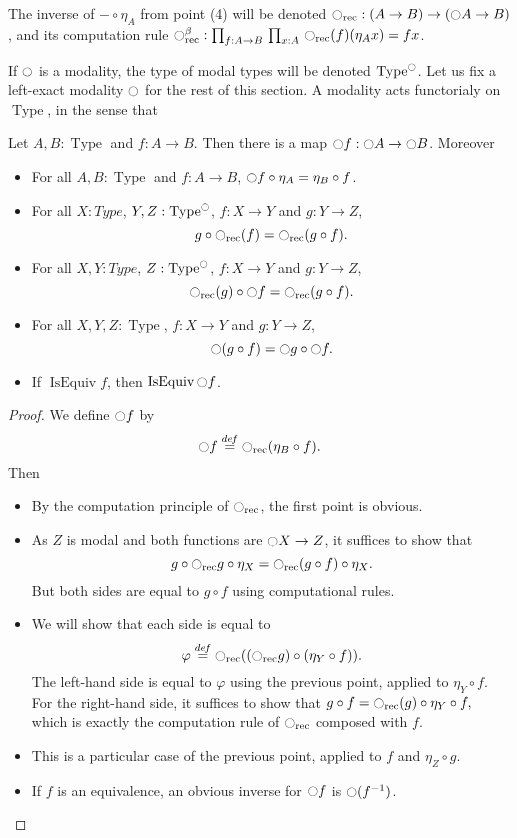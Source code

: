 \documentclass[notfinal]{jfrarticle}
\DeclareMathOperator{\Type}{Type}
\DeclareMathOperator{\IsEquiv}{IsEquiv}
\newcommand \defeq {\overset{de\hspace{-0.2ex}f}{=}}
\newcommand{\modal}{\ensuremath{\ocircle}}
\newcommand{\prodD}[3]{\prod_{#1:#2}\, #3}
\begin{document}
\begin{rmq}
  The inverse of $- \circ \eta_A$ from point {(4)} will be
  denoted $\modal_{\mathrm{rec}}: (A\to B) \to (\modal A \to B)$, and its
  computation rule $\modal_{\mathrm{rec}}^\beta : \prodD f {A \to B} {\prodD x A
  {\modal_{\mathrm{rec}}(f) (\eta_A x) = f x}}$.
\end{rmq}

If $\modal$ is a modality, the type of modal types will be denoted
$\Type^\modal$. Let us fix a left-exact modality $\modal$ for the rest
of this section. A modality acts functorialy on $\Type$, in the sense
that

\begin{lem}
  Let $A,B:\Type$ and $f:A\to B$. Then there is a map $\modal f:\modal
  A \to \modal B$. Moreover
  \begin{itemize}
  \item For all $A,B:\Type$ and $f:A\to B$, $\modal f \circ \eta_A = \eta_B \circ f$.
  \item For all $X:Type$, $Y,Z:\Type^\modal$, $f:X\to Y$ and $g:Y\to
    Z$, 
    \[g \circ \modal_{\text{rec}}(f) = \modal_{\text{rec}} (g\circ
    f).\]
  \item For all $X,Y:Type$, $Z:\Type^\modal$, $f:X\to Y$ and $g:Y\to
    Z$, \[\modal_{\text{rec}}(g) \circ \modal f = \modal_{\text{rec}}
    (g\circ f).\]
  \item For all $X,Y,Z:\Type$, $f:X\to Y$ and $g:Y\to Z$, 
    \[\modal (g \circ f) = \modal g \circ \modal f.\]
  \item If $\IsEquiv f$, then $\IsEquiv \modal f$.
  \end{itemize}
\end{lem}
\begin{proof}
  We define $\modal f$ by
  \[ \modal f \defeq \modal_{\text{rec}}(\eta_B \circ f).\]
  Then
  \begin{itemize}
  \item By the computation principle of $\modal_{\text{rec}}$, the
    first point is obvious.
  \item As $Z$ is modal and both functions are $\modal X\to Z$, it suffices to show that 
    \[g \circ \modal_{\text{rec}} g \circ \eta_X = \modal_{\text{rec}} (g\circ
    f) \circ \eta_X.\]
    But both sides are equal to $g\circ f$ using computational rules.
  \item We will show that each side is equal to
    \[\varphi \defeq \modal_{\text{rec}} ((\modal_{\text{rec}} g) \circ (\eta_Y
    \circ f)).\]
    The left-hand side is equal to $\varphi$ using the previous point,
    applied to $\eta_Y \circ f$.
    For the right-hand side, it suffices to show that
    $g\circ f = \modal_{\text{rec}}(g) \circ \eta_Y \circ f,$
    which is exactly the computation rule of $\modal_{\text{rec}}$
    composed with $f$.
  \item This is a particular case of the previous point, applied to
    $f$ and $\eta_Z \circ g$.
  \item If $f$ is an equivalence, an obvious inverse for $\modal f$ is
    $\modal (f^{-1})$.

  \end{itemize}
\end{proof}
\end{document}

